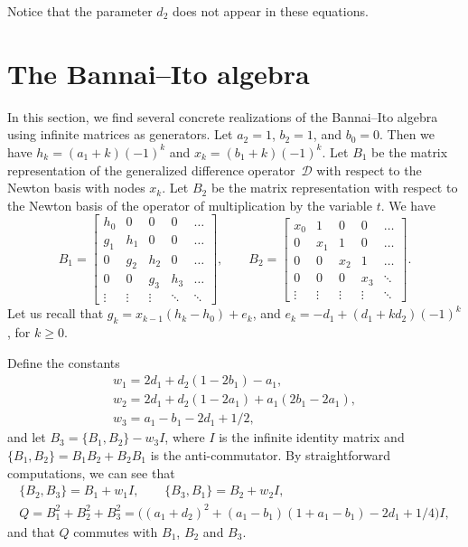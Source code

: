 \documentclass[pdftex]{sigma}
\numberwithin{equation}{section}
\begin{document}
Notice that the parameter $d_2$ does not appear in these equations.

\section{The Bannai--Ito algebra}\label{section7}
In this section, we find several concrete realizations of the Bannai--Ito algebra using infinite matrices as generators.
Let $a_2=1$, $b_2=1$, and $b_0=0$. Then we have $h_k=(a_1 +k) (-1)^k $ and ${x_k=(b_1+k) (-1)^k}$.
Let $B_1$ be the matrix representation of the generalized difference operator~$\mathcal D$ with respect to the Newton basis with nodes $x_k$. Let $B_2$ be the matrix representation with respect to the Newton basis of the operator of multiplication by the variable $t$. We have{\samepage
\begin{equation*}%
 B_1= \begin{bmatrix} h_0 & 0 & 0 & 0 & \dots \\
   g_1 & h_1 & 0 & 0 & \dots \\
     0 & g_2  & h_2  & 0 & \dots \\
       0 & 0 & g_3  & h_3 & \dots \\
   \vdots  & \vdots  & \vdots  & \ddots  &  \ddots  \end{bmatrix}, \qquad
 B_2 = \begin{bmatrix} x_0 & 1 & 0 & 0 & \dots \\
       0 & x_1 & 1 & 0 & \dots \\
      0 & 0 & x_2  & 1 & \dots \\
      0 & 0 & 0 & x_3 & \ddots \\
 \vdots  & \vdots  & \vdots  & \vdots  &  \ddots  \end{bmatrix}.
\end{equation*}
	Let us recall that $g_k=x_{k-1}(h_k-h_0) + e_k$, and
	$e_k=-d_1 + (d_1+ k d_2) (-1)^k$, for $k\ge 0$.}

Define the constants
\begin{gather}
	w_1=2 d_1 +d_2 (1-2 b_1)-a_1, \nonumber\\
	 w_2=2 d_1 + d_2 (1- 2 a_1)+ a_1 ( 2 b_1 - 2 a_1), \nonumber\\
	 w_3= a_1 -b_1 - 2 d_1 +1/2,\label{eq:defwj}
\end{gather}
and let $B_3=\{B_1, B_2\} - w_3 I$, where $I$ is the infinite identity matrix and
$\{B_1,B_2\}=B_1 B_2 + B_2 B_1$ is the anti-commutator.
By straightforward computations, we can see that
\begin{gather*}
 \{B_2, B_3\}=B_1 + w_1 I, \qquad  \{B_3,B_1\}= B_2 + w_2 I, \\
 Q=B_1^2+ B_2^2+B_3^2= \bigl((a_1+d_2)^2+(a_1-b_1)(1+ a_1 - b_1) - 2 d_1 +1/4\bigr) I,
 \end{gather*}
and that $Q$ commutes with $B_1$, $B_2$ and $B_3$.
\end{document}
